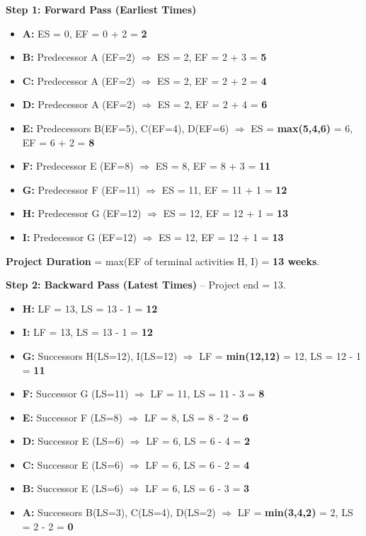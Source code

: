 \documentclass[11pt]{article}
\begin{document}
\begin{exoresolu}
\textbf{Step 1: Forward Pass (Earliest Times)}

\begin{itemize}
    \item \textbf{A:} ES = 0, EF = 0 + 2 = \textbf{2}
    \item \textbf{B:} Predecessor A (EF=2) $\Rightarrow$ ES = 2, EF = 2 + 3 = \textbf{5}
    \item \textbf{C:} Predecessor A (EF=2) $\Rightarrow$ ES = 2, EF = 2 + 2 = \textbf{4}
    \item \textbf{D:} Predecessor A (EF=2) $\Rightarrow$ ES = 2, EF = 2 + 4 = \textbf{6}
    \item \textbf{E:} Predecessors B(EF=5), C(EF=4), D(EF=6) $\Rightarrow$ ES = \textbf{max(5,4,6)} = 6, EF = 6 + 2 = \textbf{8}
    \item \textbf{F:} Predecessor E (EF=8) $\Rightarrow$ ES = 8, EF = 8 + 3 = \textbf{11}
    \item \textbf{G:} Predecessor F (EF=11) $\Rightarrow$ ES = 11, EF = 11 + 1 = \textbf{12}
    \item \textbf{H:} Predecessor G (EF=12) $\Rightarrow$ ES = 12, EF = 12 + 1 = \textbf{13}
    \item \textbf{I:} Predecessor G (EF=12) $\Rightarrow$ ES = 12, EF = 12 + 1 = \textbf{13}
\end{itemize}
\textbf{Project Duration} = max(EF of terminal activities H, I) = \textbf{13 weeks}.

\textbf{Step 2: Backward Pass (Latest Times)} -- Project end = 13.

\begin{itemize}
    \item \textbf{H:} LF = 13, LS = 13 - 1 = \textbf{12}
    \item \textbf{I:} LF = 13, LS = 13 - 1 = \textbf{12}
    \item \textbf{G:} Successors H(LS=12), I(LS=12) $\Rightarrow$ LF = \textbf{min(12,12)} = 12, LS = 12 - 1 = \textbf{11}
    \item \textbf{F:} Successor G (LS=11) $\Rightarrow$ LF = 11, LS = 11 - 3 = \textbf{8}
    \item \textbf{E:} Successor F (LS=8) $\Rightarrow$ LF = 8, LS = 8 - 2 = \textbf{6}
    \item \textbf{D:} Successor E (LS=6) $\Rightarrow$ LF = 6, LS = 6 - 4 = \textbf{2}
    \item \textbf{C:} Successor E (LS=6) $\Rightarrow$ LF = 6, LS = 6 - 2 = \textbf{4}
    \item \textbf{B:} Successor E (LS=6) $\Rightarrow$ LF = 6, LS = 6 - 3 = \textbf{3}
    \item \textbf{A:} Successors B(LS=3), C(LS=4), D(LS=2) $\Rightarrow$ LF = \textbf{min(3,4,2)} = 2, LS = 2 - 2 = \textbf{0}
\end{itemize}


\end{exoresolu}
\end{document}
